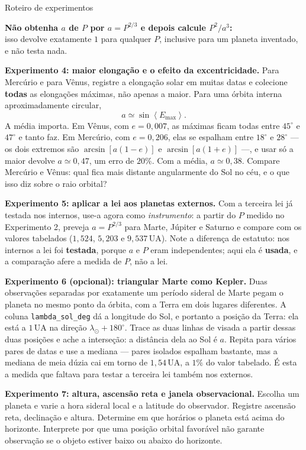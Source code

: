 \documentclass[11pt,a4paper]{article}
\begin{document}
\begin{lessonblock}[borderline west={2pt}{0pt}{astroGold}]{Roteiro de experimentos}
\begin{center}
\textbf{Não obtenha $a$ de $P$ por $a=P^{2/3}$ e depois calcule $P^2/a^3$:}\\
isso devolve exatamente $1$ para qualquer $P$, inclusive para um planeta inventado, e não testa nada.
\end{center}

\textbf{Experimento 4: maior elongação e o efeito da excentricidade.}
Para Mercúrio e para Vênus, registre a elongação solar em muitas datas e colecione \textbf{todas} as elongações
máximas, não apenas a maior. Para uma órbita interna aproximadamente circular,
\[
a\simeq\sin\left\langle E_{\max}\right\rangle .
\]
A média importa. Em Vênus, com $e=0{,}007$, as máximas ficam todas entre $45^\circ$ e $47^\circ$ e tanto faz.
Em Mercúrio, com $e=0{,}206$, elas se espalham entre $18^\circ$ e $28^\circ$ --- os dois extremos são
$\arcsin[a(1-e)]$ e $\arcsin[a(1+e)]$ ---, e usar só a maior devolve $a\simeq0{,}47$, um erro de $20\%$. Com a
média, $a\simeq0{,}38$. Compare Mercúrio e Vênus: qual fica mais distante angularmente do Sol no céu, e o que
isso diz sobre o raio orbital?

\textbf{Experimento 5: aplicar a lei aos planetas externos.}
Com a terceira lei já testada nos internos, use-a agora como \emph{instrumento}: a partir do $P$ medido no
Experimento 2, preveja $a=P^{2/3}$ para Marte, Júpiter e Saturno e compare com os valores tabelados
($1{,}524$, $5{,}203$ e $9{,}537\,\mathrm{UA}$). Note a diferença de estatuto: nos internos a lei foi
\textbf{testada}, porque $a$ e $P$ eram independentes; aqui ela é \textbf{usada}, e a comparação afere a
medida de $P$, não a lei.

\textbf{Experimento 6 (opcional): triangular Marte como Kepler.}
Duas observações separadas por exatamente um período sideral de Marte pegam o planeta no mesmo ponto da órbita,
com a Terra em dois lugares diferentes. A coluna \texttt{lambda\_sol\_deg} dá a longitude do Sol, e portanto a
posição da Terra: ela está a $1\,\mathrm{UA}$ na direção $\lambda_\odot+180^\circ$. Trace as duas linhas de
visada a partir dessas duas posições e ache a interseção: a distância dela ao Sol é $a$. Repita para vários
pares de datas e use a mediana --- pares isolados espalham bastante, mas a mediana de meia dúzia cai em torno de
$1{,}54\,\mathrm{UA}$, a $1\%$ do valor tabelado. É esta a medida que faltava para testar a terceira lei também nos externos.

\textbf{Experimento 7: altura, ascensão reta e janela observacional.}
Escolha um planeta e varie a hora sideral local e a latitude do observador. Registre ascensão reta, declinação
e altura. Determine em que horários o planeta está acima do horizonte. Interprete por que uma posição orbital
favorável não garante observação se o objeto estiver baixo ou abaixo do horizonte.
\end{lessonblock}
\end{document}

